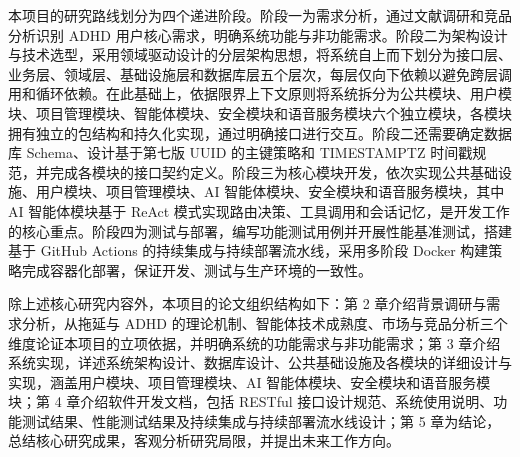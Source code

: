 \par 本项目的研究路线划分为四个递进阶段。阶段一为需求分析，通过文献调研和竞品分析识别 ADHD 用户核心需求，明确系统功能与非功能需求。阶段二为架构设计与技术选型，采用领域驱动设计的分层架构思想，将系统自上而下划分为接口层、业务层、领域层、基础设施层和数据库层五个层次，每层仅向下依赖以避免跨层调用和循环依赖。在此基础上，依据限界上下文原则将系统拆分为公共模块、用户模块、项目管理模块、智能体模块、安全模块和语音服务模块六个独立模块，各模块拥有独立的包结构和持久化实现，通过明确接口进行交互。阶段二还需要确定数据库 Schema、设计基于第七版 UUID 的主键策略和 TIMESTAMPTZ 时间戳规范，并完成各模块的接口契约定义。阶段三为核心模块开发，依次实现公共基础设施、用户模块、项目管理模块、AI 智能体模块、安全模块和语音服务模块，其中 AI 智能体模块基于 ReAct 模式实现路由决策、工具调用和会话记忆，是开发工作的核心重点。阶段四为测试与部署，编写功能测试用例并开展性能基准测试，搭建基于 GitHub Actions 的持续集成与持续部署流水线，采用多阶段 Docker 构建策略完成容器化部署，保证开发、测试与生产环境的一致性。

\par 除上述核心研究内容外，本项目的论文组织结构如下：第 2 章介绍背景调研与需求分析，从拖延与 ADHD 的理论机制、智能体技术成熟度、市场与竞品分析三个维度论证本项目的立项依据，并明确系统的功能需求与非功能需求；第 3 章介绍系统实现，详述系统架构设计、数据库设计、公共基础设施及各模块的详细设计与实现，涵盖用户模块、项目管理模块、AI 智能体模块、安全模块和语音服务模块；第 4 章介绍软件开发文档，包括 RESTful 接口设计规范、系统使用说明、功能测试结果、性能测试结果及持续集成与持续部署流水线设计；第 5 章为结论，总结核心研究成果，客观分析研究局限，并提出未来工作方向。
